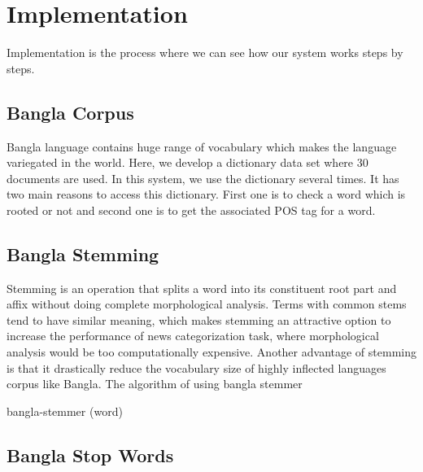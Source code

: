 \chapter{Implementation}
\label{Ch_Chapter4}

Implementation is the process where we can see how our system works steps by steps.

\section{Bangla Corpus}

Bangla language contains huge range of vocabulary which makes the language variegated in the world. Here, we develop a dictionary data set where 30 documents are used. In this system, we use the dictionary several times. It has two main reasons to access this dictionary.  First one is to check a word which is rooted or not and second one is to get the associated POS tag for a word.

\section{Bangla Stemming}

Stemming is an operation that splits a word into its constituent root part and affix without doing complete morphological analysis. Terms with common stems tend to have similar meaning, which makes stemming an attractive option to increase the performance of news categorization task, where morphological analysis would be too computationally expensive. Another advantage of stemming is that it drastically reduce the vocabulary size of highly inflected languages corpus like Bangla.
The algorithm of using bangla stemmer


\begin{algorithm}[H]
 
 \caption{bangla-stemmer (word)}

\end{algorithm}


\section{Bangla Stop Words}

